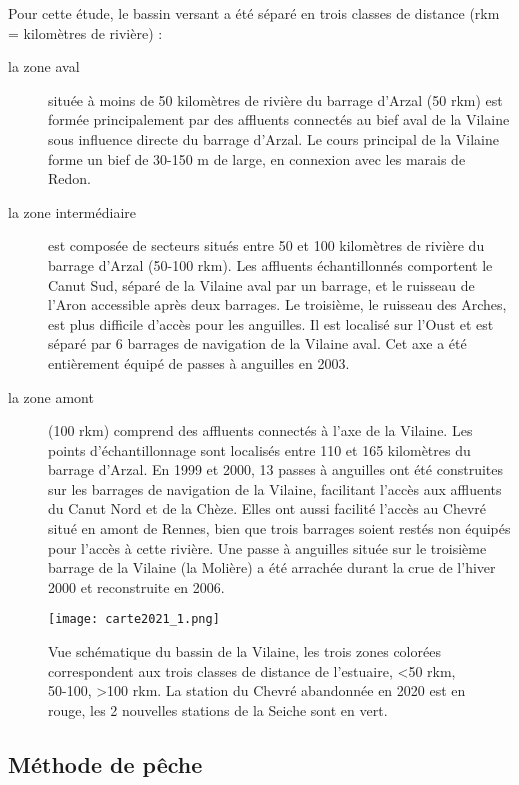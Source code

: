 \documentclass[10pt,twocolumn,titlepage,twoside]{article}\usepackage[]{graphicx}\usepackage[]{color}
\begin{document}
Pour cette étude, le bassin versant a été séparé en trois
classes de distance (rkm = kilomètres de rivière) :
\begin{description}
\item [la zone aval] située
à moins de 50 kilomètres de rivière du barrage
d'Arzal (50 rkm) est formée principalement
par des affluents connectés au bief aval de la Vilaine sous influence
directe du barrage d'Arzal. Le cours principal de la
Vilaine forme un bief de 30-150 m de large, en connexion avec les
marais de Redon.
\item [la zone intermédiaire] est composée de secteurs
situés entre 50 et 100 kilomètres de rivière du barrage
d'Arzal (50-100 rkm). Les affluents échantillonnés
comportent le Canut Sud, séparé de la Vilaine aval par un barrage,
et le ruisseau de l'Aron accessible après deux
barrages. Le troisième, le ruisseau des Arches, est plus difficile
d'accès pour les anguilles. Il est localisé sur
l'Oust et est séparé par 6 barrages de navigation
de la Vilaine aval. Cet axe a été entièrement équipé de
passes à anguilles en 2003.
\item [la zone amont] (100 rkm) comprend des affluents connectés à
l'axe de la Vilaine. Les points
d'échantillonnage sont localisés entre 110 et 165
kilomètres du barrage d'Arzal. En 1999 et 2000, 13
passes à anguilles ont été construites sur les barrages de
navigation de la Vilaine, facilitant l'accès aux
affluents du Canut Nord et de la Chèze. Elles ont aussi facilité
l'accès au Chevré situé en amont de Rennes, bien
que trois barrages soient restés non équipés pour
l'accès à cette rivière. Une passe à anguilles
située sur le troisième barrage de la Vilaine (la Molière) a
été arrachée durant la crue de l'hiver 2000 et
reconstruite en 2006.
\end{description}
\begin{figure}[htbp]
\centering
\texttt{[image: carte2021\_1.png]}
\caption[Vue schématique du bassin de la Vilaine]{Vue schématique du bassin de
la Vilaine, les trois zones colorées correspondent aux trois classes de
distance de l'estuaire, <50 rkm, 50-100, >100 rkm. La station du Chevré
abandonnée en 2020 est en rouge, les 2 nouvelles stations de la Seiche sont en
vert. }
\label{fig_carte}
\end{figure}
\subsection{Méthode de pêche}
\end{document}
